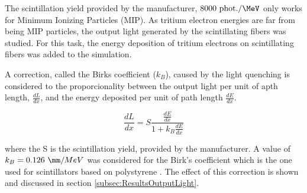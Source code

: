 The scintillation yield provided by the manufacturer, $8000~\text{phot.}/\MeV$ only works for Minimum Ionizing Particles (MIP). As tritium electron energies are far from being MIP particles, the output light generated by the scintillating fibers was studied. For this task, the energy deposition of tritium electrons on scintillating fibers was added to the simulation.

A correction, called the Birks coefficient ($k_B$), caused by the light quenching is considered to the proporcionality between the output light per unit of apth length, $\frac{dL}{dx}$, and the energy deposited per unit of path length $\frac{dE}{dx}$\cite{BirksPaper}.

\begin{equation}
\frac{dL}{dx}= S\frac{\frac{dE}{dx}}{1+k_B\frac{dE}{dx}}
\label{eq:birkscoefficient}
\end{equation}

where the S is the scintillation yield, provided by the manufacturer. A value of $k_B=0.126~\mm/MeV$ was considered for the Birk's coefficient which is the one used for scintillators based on polystyrene \cite{BirksCoefficient}. The effect of this correction is shown and discussed in section \ref{subsec:ResultsOutputLight}.